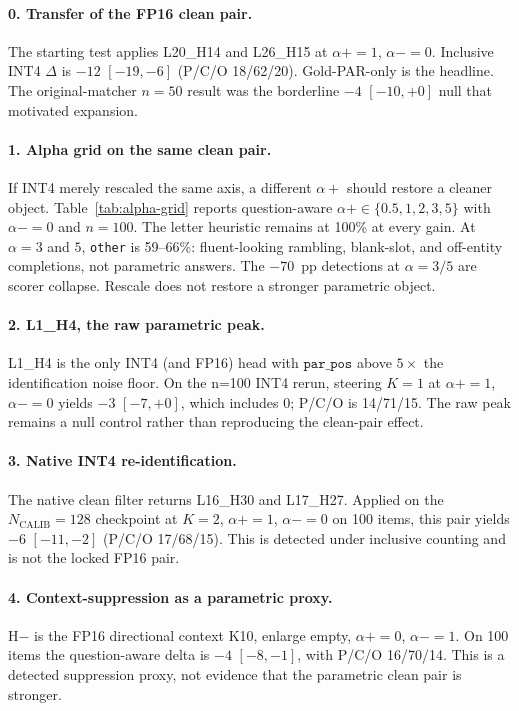 \documentclass{article} %
\begin{document}
\paragraph{0. Transfer of the FP16 clean pair.}
The starting test applies L20\_H14 and L26\_H15 at $\alpha{+}{=}1$, $\alpha{-}{=}0$. Inclusive INT4 $\Delta$ is $-12$ $[-19,-6]$ (P/C/O 18/62/20). Gold-PAR-only is the headline. The original-matcher $n{=}50$ result was the borderline $-4$ $[-10,+0]$ null that motivated expansion.

\paragraph{1. Alpha grid on the same clean pair.}
If INT4 merely rescaled the same axis, a different $\alpha{+}$ should restore a cleaner object. Table~\ref{tab:alpha-grid} reports question-aware $\alpha{+} \in \{0.5, 1, 2, 3, 5\}$ with $\alpha{-}{=}0$ and $n{=}100$. The letter heuristic remains at 100\% at every gain. At $\alpha{=}3$ and $5$, \texttt{other} is 59--66\%: fluent-looking rambling, blank-slot, and off-entity completions, not parametric answers. The $-70$~pp detections at $\alpha{=}3/5$ are scorer collapse. Rescale does not restore a stronger parametric object.

\paragraph{2. L1\_H4, the raw parametric peak.}
L1\_H4 is the only INT4 (and FP16) head with $\texttt{par\_pos}$ above $5\times$ the identification noise floor. On the n=100 INT4 rerun, steering $K{=}1$ at $\alpha{+}{=}1$, $\alpha{-}{=}0$ yields $-3$ $[-7,+0]$, which includes 0; P/C/O is 14/71/15. The raw peak remains a null control rather than reproducing the clean-pair effect.

\paragraph{3. Native INT4 re-identification.}
The native clean filter returns L16\_H30 and L17\_H27. Applied on the $N_{\mathrm{CALIB}}{=}128$ checkpoint at $K{=}2$, $\alpha{+}{=}1$, $\alpha{-}{=}0$ on 100 items, this pair yields $-6$ $[-11,-2]$ (P/C/O 17/68/15). This is detected under inclusive counting and is not the locked FP16 pair.

\paragraph{4. Context-suppression as a parametric proxy.}
H$-$ is the FP16 directional context K10, enlarge empty, $\alpha{+}{=}0$, $\alpha{-}{=}1$. On 100 items the question-aware delta is $-4$ $[-8,-1]$, with P/C/O 16/70/14. This is a detected suppression proxy, not evidence that the parametric clean pair is stronger.
\end{document}

